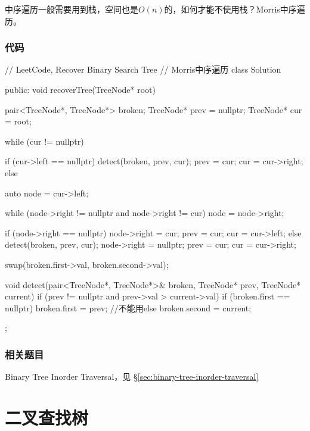 中序遍历一般需要用到栈，空间也是$O(n)$的，如何才能不使用栈？Morris中序遍历。


\subsubsection{代码}

\begin{Code}
// LeetCode, Recover Binary Search Tree
// Morris中序遍历
class Solution {
public:
    void recoverTree(TreeNode* root) {
        pair<TreeNode*, TreeNode*> broken;
        TreeNode* prev = nullptr;
        TreeNode* cur = root;

        while (cur != nullptr) {
            if (cur->left == nullptr) {
                detect(broken, prev, cur);
                prev = cur;
                cur = cur->right;
            } else {
                auto node = cur->left;

                while (node->right != nullptr and node->right != cur)
                    node = node->right;

                if (node->right == nullptr) {
                    node->right = cur;
                    prev = cur;
                    cur = cur->left;
                } else {
                    detect(broken, prev, cur);
                    node->right = nullptr;
                    prev = cur;
                    cur = cur->right;
                }
            }
        }

        swap(broken.first->val, broken.second->val);
    }

    void detect(pair<TreeNode*, TreeNode*>& broken, TreeNode* prev,
            TreeNode* current) {
        if (prev != nullptr and prev->val > current->val) {
            if (broken.first == nullptr) {
                broken.first = prev;
            } //不能用else
            broken.second = current;
        }
    }
};
\end{Code}


\subsubsection{相关题目}
\begindot
\item Binary Tree Inorder Traversal，见 \S \ref{sec:binary-tree-inorder-traversal}
\myenddot


\section{二叉查找树} %


